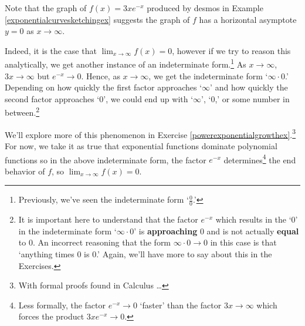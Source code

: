 \documentclass{ximera}
\begin{document}
Note that the graph of $f(x) = 3xe^{-x}$ produced by desmos in  Example \ref{exponentialcurvesketchingex} suggests the graph of $f$ has a horizontal asymptote $y=0$ as $x \rightarrow \infty$.

Indeed, it is the case that $\lim_{x \rightarrow \infty} f(x) = 0$, however if we try to reason this analytically, we get another instance of an indeterminate form.\footnote{Previously, we've seen the indeterminate form `$\frac{0}{0}$.'}  As $x \rightarrow \infty$, $3x \rightarrow \infty$ but $e^{-x} \rightarrow 0$.  Hence, as $x \rightarrow \infty$, we get the indeterminate form `$\infty \cdot 0$.' Depending on how quickly the first factor approaches `$\infty$' and how quickly the second factor approaches `$0$', we could end up with `$\infty$', `$0$,' or some number in between.\footnote{It is important here to understand that the factor  $e^{-x}$ which results in the `$0$' in the indeterminate form  `$\infty \cdot 0$' is \textbf{approaching} $0$ and is not actually \textbf{equal} to $0$.  An incorrect reasoning that  the form $\infty \cdot 0 \rightarrow 0$ in this case is that `anything times $0$ is $0$.'  Again, we'll have more to say about this in the Exercises.}



We'll explore more of this phenomenon in Exercise \ref{powerexponentialgrowthex}.\footnote{With formal proofs found in Calculus \ldots} For now, we take it as true that exponential functions dominate polynomial functions so in the above indeterminate form,  the factor $e^{-x}$ determines\footnote{Less formally, the factor $e^{-x} \rightarrow 0$ `faster' than the factor $3x \rightarrow \infty$ which forces the product $3x e^{-x} \rightarrow 0$.} the end behavior of $f$, so $\lim_{x \rightarrow \infty} f(x) = 0$.



\closegraphsfile
\end{document}
